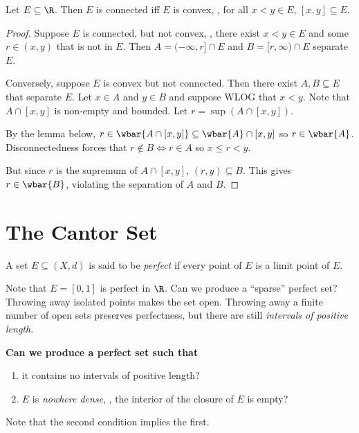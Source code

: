 \begin{theorem}
    Let $E \subseteq \R$.
    Then $E$ is connected iff $E$ is convex, \ie, for all $x < y \in E$,
    $[x, y] \subseteq E$.
\end{theorem}
\begin{proof}
    Suppose $E$ is connected, but not convex, \ie, there exist $x < y \in E$
    and some $r \in (x, y)$ that is not in $E$.
    Then $A = (-\infty, r] \cap E$ and $B = [r, \infty) \cap E$ separate
    $E$.

    Conversely, suppose $E$ is convex but not connected.
    Then there exist $A, B \subseteq E$ that separate $E$.
    Let $x \in A$ and $y \in B$ and suppose WLOG that $x < y$.
    Note that $A \cap [x, y]$ is non-empty and bounded.
    Let $r = \sup(A \cap [x, y])$.

    By the lemma below, $r \in \wbar{A \cap [x, y]} \subseteq \wbar{A}
    \cap [x, y]$ so $r \in \wbar{A}$.
    Disconnectedness forces that $r \notin B \iff r \in A$ so $x \le r < y$.

    But since $r$ is the supremum of $A \cap [x, y]$, $(r, y) \subseteq B$.
    This gives $r \in \wbar{B}$, violating the separation of $A$ and $B$.
\end{proof}

\section{The Cantor Set} \label{sec:cantor_set}
\begin{definition} \label{def:perfect_set}
    A set $E \subseteq (X, d)$ is said to be \emph{perfect} if every point
    of $E$ is a limit point of $E$.
\end{definition}
Note that $E = [0, 1]$ is perfect in $\R$.
Can we produce a ``sparse'' perfect set?
Throwing away isolated points makes the set open.
Throwing away a finite number of open sets preserves perfectness, but there
are still \emph{intervals of positive length}.

\textbf{Can we produce a perfect set such that}
\begin{enumerate}
    \item it contains no intervals of positive length?
    \item $E$ is \emph{nowhere dense}, \ie, the interior of the closure of
    $E$ is empty?
\end{enumerate}
Note that the second condition implies the first.
